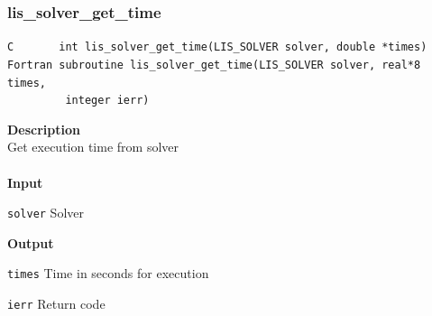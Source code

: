 \documentclass[a4paper]{article}
\newcommand{\namelistlabel}[1]{\mbox{#1}\hfill}
\newenvironment{namelist}[1]{%
 \begin{list}{}
  {\let\makelabel\namelistlabel
  \settowidth{\labelwidth}{#1}
  \setlength{\leftmargin}{1.1\labelwidth}}
}{%
\end{list}}
\begin{document}
  \subsubsection{lis\_solver\_get\_time}
\begin{screen}
\verb|C       int lis_solver_get_time(LIS_SOLVER solver, double *times)|\\
\verb|Fortran subroutine lis_solver_get_time(LIS_SOLVER solver, real*8 times,|\\
\verb|         integer ierr)|
\end{screen}
{\bf Description}\\
\indent
Get execution time from solver
\\ \\
\noindent
{\bf Input}
\begin{namelist}{XXXXXXXXXXXXXXXXXXXX}
\item[\tt solver] Solver
\end{namelist}
{\bf Output}
\begin{namelist}{XXXXXXXXXXXXXXXXXXXX}
\item[\tt times] Time in seconds for execution
\item[\tt ierr] Return code
\end{namelist}
\newpage
\end{document}
